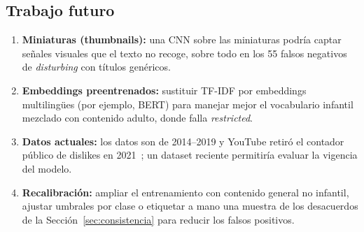 \documentclass[conference]{IEEEtran}
\begin{document}
\subsection{Trabajo futuro}\label{sec:next}
\begin{enumerate}
\item \textbf{Miniaturas (thumbnails):} una CNN sobre las miniaturas podría captar señales visuales que el texto no recoge, sobre todo en los 55 falsos negativos de \textit{disturbing} con títulos genéricos.
\item \textbf{Embeddings preentrenados:} sustituir TF-IDF por embeddings multilingües (por ejemplo, BERT) para manejar mejor el vocabulario infantil mezclado con contenido adulto, donde falla \textit{restricted}.
\item \textbf{Datos actuales:} los datos son de 2014--2019 y YouTube retiró el contador público de dislikes en 2021~\cite{ytdislikes}; un dataset reciente permitiría evaluar la vigencia del modelo.
\item \textbf{Recalibración:} ampliar el entrenamiento con contenido general no infantil, ajustar umbrales por clase o etiquetar a mano una muestra de los desacuerdos de la Sección~\ref{sec:consistencia} para reducir los falsos positivos.
\end{enumerate}


\nocite{urbina2026machinelearning}
{\raggedright

}
\end{document}
